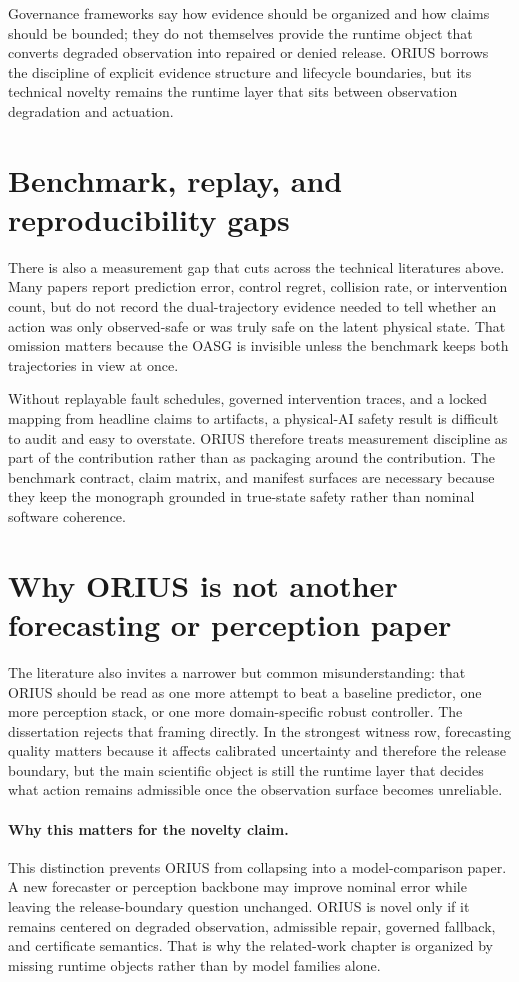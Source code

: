 Governance frameworks say how evidence should be organized and how claims should be bounded;
they do not themselves provide the runtime object that converts degraded observation into
repaired or denied release. ORIUS borrows the discipline of explicit evidence structure and
lifecycle boundaries, but its technical novelty remains the runtime layer that sits between
observation degradation and actuation.

\section{Benchmark, replay, and reproducibility gaps}
There is also a measurement gap that cuts across the technical literatures above. Many papers
report prediction error, control regret, collision rate, or intervention count, but do not
record the dual-trajectory evidence needed to tell whether an action was only observed-safe or
was truly safe on the latent physical state. That omission matters because the OASG is
invisible unless the benchmark keeps both trajectories in view at once.

Without replayable fault schedules, governed intervention traces, and a locked mapping from
headline claims to artifacts, a physical-AI safety result is difficult to audit and easy to
overstate. ORIUS therefore treats measurement discipline as part of the contribution rather
than as packaging around the contribution. The benchmark contract, claim matrix, and manifest
surfaces are necessary because they keep the monograph grounded in true-state safety rather
than nominal software coherence.

\section{Why ORIUS is not another forecasting or perception paper}
The literature also invites a narrower but common misunderstanding: that ORIUS should be read as
one more attempt to beat a baseline predictor, one more perception stack, or one more
domain-specific robust controller. The dissertation rejects that framing directly. In the
strongest witness row, forecasting quality matters because it affects calibrated uncertainty and
therefore the release boundary, but the main scientific object is still the runtime layer that
decides what action remains admissible once the observation surface becomes unreliable.

\paragraph{Why this matters for the novelty claim.}
This distinction prevents ORIUS from collapsing into a model-comparison paper. A new forecaster
or perception backbone may improve nominal error while leaving the release-boundary question
unchanged. ORIUS is novel only if it remains centered on degraded observation, admissible
repair, governed fallback, and certificate semantics. That is why the related-work chapter is
organized by missing runtime objects rather than by model families alone.

